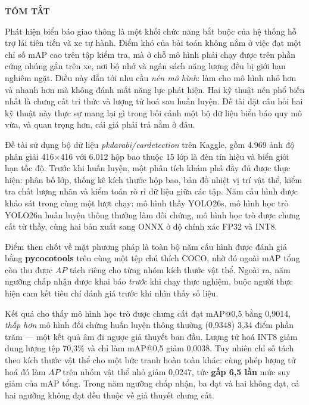 \newpage
\thispagestyle{plain}

\begin{center}
    {\bfseries\Large TÓM TẮT}
\end{center}

\vspace{1cm}

Phát hiện biển báo giao thông là một khối chức năng bắt buộc của hệ thống hỗ trợ lái tiên tiến và
xe tự hành. Điểm khó của bài toán không nằm ở việc đạt một chỉ số mAP cao trên tập kiểm tra, mà ở
chỗ mô hình phải chạy được trên phần cứng nhúng gắn trên xe, nơi bộ nhớ và ngân sách năng lượng
đều bị giới hạn nghiêm ngặt. Điều này dẫn tới nhu cầu \emph{nén mô hình}: làm cho mô hình nhỏ hơn
và nhanh hơn mà không đánh mất năng lực phát hiện. Hai kỹ thuật nén phổ biến nhất là chưng cất tri
thức và lượng tử hoá sau huấn luyện. Đề tài đặt câu hỏi hai kỹ thuật này thực sự mang lại gì trong
bối cảnh một bộ dữ liệu biển báo quy mô vừa, và quan trọng hơn, cái giá phải trả nằm ở đâu.

Đề tài sử dụng bộ dữ liệu \textit{pkdarabi/cardetection} trên Kaggle, gồm 4.969 ảnh độ phân giải
416$\times$416 với 6.012 hộp bao thuộc 15 lớp là đèn tín hiệu và biển giới hạn tốc độ. Trước khi
huấn luyện, một phân tích khám phá đầy đủ được thực hiện: phân bố lớp, thống kê kích thước hộp bao,
bản đồ nhiệt vị trí vật thể, kiểm tra chất lượng nhãn và kiểm toán rò rỉ dữ liệu giữa các tập. Năm
cấu hình được khảo sát trong cùng một lượt chạy: mô hình thầy YOLO26s, mô hình học trò YOLO26n
huấn luyện thông thường làm đối chứng, mô hình học trò được chưng cất từ thầy, cùng hai bản xuất
sang ONNX ở độ chính xác FP32 và INT8.

Điểm then chốt về mặt phương pháp là toàn bộ năm cấu hình được đánh giá bằng \textbf{pycocotools}
trên cùng một tệp chú thích COCO, nhờ đó ngoài mAP tổng còn thu được $AP$ tách riêng cho từng nhóm
kích thước vật thể. Ngoài ra, năm ngưỡng chấp nhận được khai báo \emph{trước} khi chạy thực nghiệm,
buộc người thực hiện cam kết tiêu chí đánh giá trước khi nhìn thấy số liệu.

Kết quả cho thấy mô hình học trò được chưng cất đạt mAP@0,5 bằng 0,9014, \emph{thấp hơn} mô hình
đối chứng huấn luyện thông thường (0,9348) 3,34 điểm phần trăm --- một kết quả âm đi ngược giả
thuyết ban đầu. Lượng tử hoá INT8 giảm dung lượng tệp 70,3\% và chỉ làm mAP@0,5 giảm 0,0038. Tuy
nhiên chỉ số tách theo kích thước vật thể cho một bức tranh hoàn toàn khác: cùng phép lượng tử hoá
đó làm $AP$ trên nhóm vật thể nhỏ giảm 0,0247, tức \textbf{gấp 6,5 lần} mức suy giảm của mAP tổng.
Trong năm ngưỡng chấp nhận, ba đạt và hai không đạt, cả hai ngưỡng không đạt đều thuộc về giả
thuyết chưng cất.

